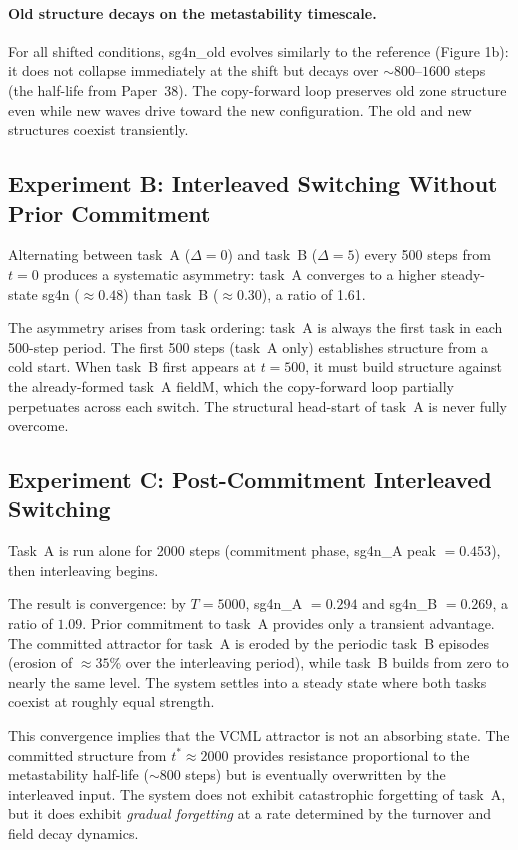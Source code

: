 \documentclass[11pt]{article}
\begin{document}
\paragraph{Old structure decays on the metastability timescale.}
For all shifted conditions, sg4n\_old evolves similarly to the reference (Figure 1b):
it does not collapse immediately at the shift but decays over $\sim800$--$1600$ steps
(the half-life from Paper~38).
The copy-forward loop preserves old zone structure even while new waves drive toward the
new configuration.
The old and new structures coexist transiently.

\subsection{Experiment B: Interleaved Switching Without Prior Commitment}

Alternating between task~A ($\Delta=0$) and task~B ($\Delta=5$) every 500 steps from $t=0$
produces a systematic asymmetry:
task~A converges to a higher steady-state sg4n ($\approx 0.48$) than task~B ($\approx
0.30$), a ratio of 1.61.

The asymmetry arises from task ordering: task~A is always the first task in each 500-step
period.
The first 500 steps (task~A only) establishes structure from a cold start.
When task~B first appears at $t=500$, it must build structure against the already-formed
task~A fieldM, which the copy-forward loop partially perpetuates across each switch.
The structural head-start of task~A is never fully overcome.

\subsection{Experiment C: Post-Commitment Interleaved Switching}

Task~A is run alone for 2000 steps (commitment phase, sg4n\_A peak $=0.453$), then
interleaving begins.

The result is convergence: by $T=5000$, sg4n\_A $= 0.294$ and sg4n\_B $= 0.269$,
a ratio of $1.09$.
Prior commitment to task~A provides only a transient advantage.
The committed attractor for task~A is eroded by the periodic task~B episodes
(erosion of $\approx35\%$ over the interleaving period), while task~B builds from zero
to nearly the same level.
The system settles into a steady state where both tasks coexist at roughly equal strength.

This convergence implies that the VCML attractor is not an absorbing state.
The committed structure from $t^*\approx2000$ provides resistance proportional to the
metastability half-life ($\sim800$ steps) but is eventually overwritten by the
interleaved input.
The system does not exhibit catastrophic forgetting of task~A, but it does exhibit
\emph{gradual forgetting} at a rate determined by the turnover and field decay dynamics.
\end{document}
